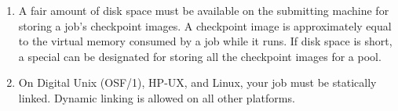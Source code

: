 \begin{enumerate}
\item A fair amount of disk space must be available on the submitting machine
for storing a job's checkpoint images.  A checkpoint image is approximately
equal to the virtual memory consumed by a job while it runs.  If disk space
is short, a special  can be designated for storing
all the checkpoint images for a pool.

\item On Digital Unix (OSF/1), HP-UX, and Linux, your job must be
statically linked. Dynamic linking is allowed on all other platforms.

\end{enumerate}
